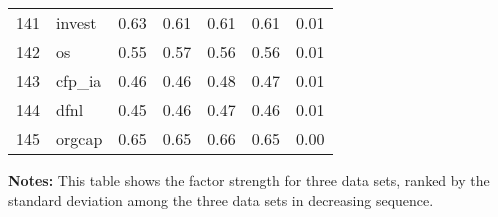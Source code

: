 \documentclass[12pt]{article}
\begin{document}
\begin{footnotesize}
\begin{longtable}{rl|c|c|c|c|c}
141 & invest           & 0.63                                                                                      & 0.61                                                                                        & 0.61                                                                                         & 0.61 & 0.01               \\
142 & os               & 0.55                                                                                      & 0.57                                                                                        & 0.56                                                                                         & 0.56 & 0.01               \\
143 & cfp\_ia          & 0.46                                                                                      & 0.46                                                                                        & 0.48                                                                                         & 0.47 & 0.01               \\
144 & dfnl             & 0.45                                                                                      & 0.46                                                                                        & 0.47                                                                                         & 0.46 & 0.01               \\
145 & orgcap           & 0.65                                                                                      & 0.65                                                                                        & 0.66                                                                                         & 0.65 & 0.00               \\ \hline

\end{longtable}
{\bf Notes:}
This table shows the factor strength for three data sets, ranked by the standard deviation among the three data sets in decreasing sequence.
\end{footnotesize}

\newpage
\end{document}
